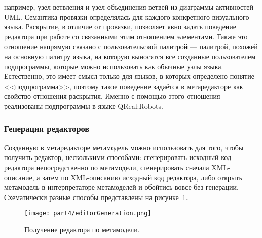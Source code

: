 \begin{enumerate}
		например, узел ветвления и узел объединения ветвей из диаграммы активностей UML. 
		Семантика провязки определялась для каждого конкретного визуального языка. Раскрытие, 
		в отличие от провязки, позволяет явно задать поведение редактора при работе со 
		связанными этим отношением элементами. Также это отношение напрямую связано с 
		пользовательской палитрой --- палитрой, похожей на основную палитру языка, на 
		которую выносятся все созданные пользователем подпрограммы, которые можно использовать 
		как обычные узлы языка. Естественно, это имеет смысл только для языков, в которых 
		определено понятие <<подпрограмма>>, поэтому такое поведение задаётся в метаредакторе 
		как свойство отношения раскрытия. Именно с помощью этого отношения реализованы 
		подпрограммы в языке QReal:Robots.
\end{enumerate}

\subsubsection{Генерация редакторов}
Созданную в метаредакторе метамодель можно использовать для того, чтобы получить редактор, 
несколькими способами: сгенерировать исходный код редактора непосредственно по метамодели, 
сгенерировать сначала XML-описание, а затем по XML-описанию исходный код редактора, 
либо открыть метамодель в интерпретаторе метамоделей и обойтись вовсе без генерации. 
Схематически разные способы представлены на рисунке~\ref{image:editorGeneration}.

\begin{figure} [ht]
	\begin{center}
		\texttt{[image: part4/editorGeneration.png]}
		\caption{Получение редактора по метамодели.}
		\label{image:editorGeneration}
	\end{center}
\end{figure}

